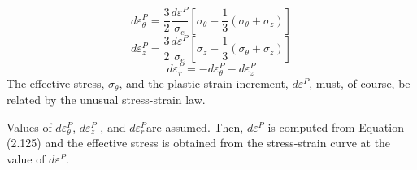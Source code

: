 \documentclass[12pt]{article}
\begin{document}
\begin{equation}
d \varepsilon_{\theta}^{P}= \frac{3}{2} \frac{d \varepsilon^P}{\sigma_e} \left[ \sigma_{\theta} - \frac{1}{3}(\sigma_{\theta}+\sigma_{z} )\right]
\end{equation}
\begin{equation}
d \varepsilon_{z}^{P}= \frac{3}{2} \frac{d \varepsilon^P}{\sigma_e} \left[ \sigma_{z} - \frac{1}{3}(\sigma_{\theta}+\sigma_{z} )\right]
\end{equation}
\begin{equation}
d \varepsilon_{r}^{P}= -d \varepsilon_{\theta}^{P}-d \varepsilon_{z}^{P}
\end{equation}
The effective stress, $\sigma_{\theta}$, and the plastic strain increment, $d\varepsilon^P$, must, of course, be related by the unusual stress-strain law. 

Values of $d \varepsilon_{\theta}^P$, $d \varepsilon_{z}^P$ , and $d \varepsilon_{r}^P$are assumed. Then, $d \varepsilon^P$ is computed from Equation (2.125) and the effective stress is obtained from the stress-strain curve at the value of $d \varepsilon^P$.
\end{document}
